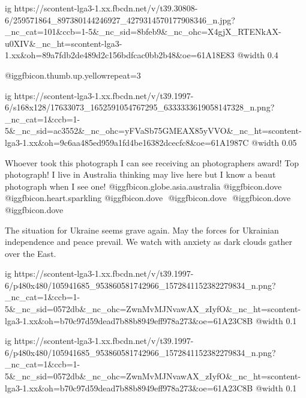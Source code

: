  
 
 
 
 

\ifcmt
  ig https://scontent-lga3-1.xx.fbcdn.net/v/t39.30808-6/259571864_897380144246927_4279314570177908346_n.jpg?_nc_cat=101&ccb=1-5&_nc_sid=8bfeb9&_nc_ohc=X4gjX_RTENkAX-u0XIV&_nc_ht=scontent-lga3-1.xx&oh=89a7fdb2de489d2c156bdfcac0bb2b48&oe=61A18E83
  @width 0.4
\fi

 @igg{fbicon.thumb.up.yellow}{repeat=3} 


\ifcmt
  ig https://scontent-lga3-1.xx.fbcdn.net/v/t39.1997-6/s168x128/17633073_1652591054767295_6333333619058147328_n.png?_nc_cat=1&ccb=1-5&_nc_sid=ac3552&_nc_ohc=yFVaSb75GMEAX85yVVO&_nc_ht=scontent-lga3-1.xx&oh=9c6aa485ed959a1fd4be16382dcecfc8&oe=61A1987C
  @width 0.05
\fi


Whoever took this photograph I can see receiving an photographers award! Top
photograph! I live in Australia thinking may live here but I know a beaut
photograph when I see one! @igg{fbicon.globe.asia.australia}  @igg{fbicon.dove} ️ @igg{fbicon.heart.sparkling}  @igg{fbicon.dove} ️ @igg{fbicon.dove} ️ @igg{fbicon.dove} ️ @igg{fbicon.dove} ️



The situation for Ukraine seems grave again. May the forces for Ukrainian
independence and peace prevail. We watch with anxiety as dark clouds gather
over the East.


\ifcmt
  ig https://scontent-lga3-1.xx.fbcdn.net/v/t39.1997-6/p480x480/105941685_953860581742966_1572841152382279834_n.png?_nc_cat=1&ccb=1-5&_nc_sid=0572db&_nc_ohc=ZwnMvMJNvawAX_zIyfO&_nc_ht=scontent-lga3-1.xx&oh=b70c97d59dead7b88b8949eff978a273&oe=61A23C8B
  @width 0.1
\fi



\ifcmt
  ig https://scontent-lga3-1.xx.fbcdn.net/v/t39.1997-6/p480x480/105941685_953860581742966_1572841152382279834_n.png?_nc_cat=1&ccb=1-5&_nc_sid=0572db&_nc_ohc=ZwnMvMJNvawAX_zIyfO&_nc_ht=scontent-lga3-1.xx&oh=b70c97d59dead7b88b8949eff978a273&oe=61A23C8B
  @width 0.1
\fi


